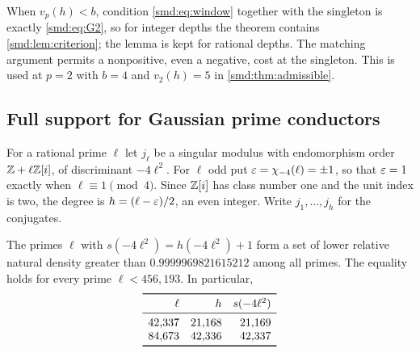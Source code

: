 When $v_p(h)<b$, condition \eqref{smd:eq:window} together with the singleton is exactly
\eqref{smd:eq:G2}, so for integer depths the theorem contains \cref{smd:lem:criterion};
the lemma is kept for rational depths. The matching argument permits a nonpositive, even a
negative, cost at the singleton. This is used at $p=2$ with $b=4$ and $v_2(h)=5$ in
\cref{smd:thm:admissible}.


\subsection{Full support for Gaussian prime conductors}\label{smd:sec:gaussian}
{\raggedright{}}

For a rational prime $\ell$ let $j_\ell$ be a singular modulus with endomorphism order
$\mathbb{Z}+\ell\mathbb{Z}[i]$, of discriminant $-4\ell^2$. For $\ell$ odd put $\varepsilon=\chi_{-4}(\ell)=\pm1$,
so that $\varepsilon=1$ exactly when $\ell\equiv1\pmod4$. Since $\mathbb{Z}[i]$ has class number one and
the unit index is two, the degree is $h=(\ell-\varepsilon)/2$, an even integer. Write
$j_1,\dots,j_h$ for the conjugates.

\begin{theorem}\label{smd:thm:gaussian}
The primes $\ell$ with $s(-4\ell^2)=h(-4\ell^2)+1$ form a set of lower relative natural
density greater than $0.9999969821615212$ among all primes. The equality holds for every
prime $\ell<456{,}193$. In particular,
\[
\begin{array}{rrr}
\toprule
\ell & h & s(-4\ell^2)\\ \midrule
42{,}337 & 21{,}168 & 21{,}169\\
84{,}673 & 42{,}336 & 42{,}337\\ \bottomrule
\end{array}
\]
\end{theorem}

